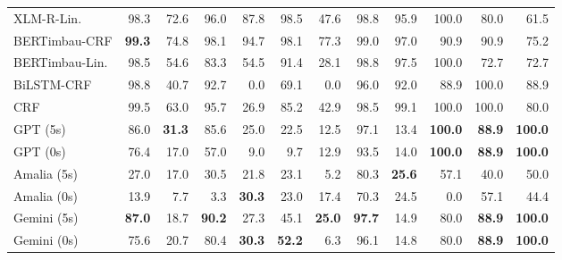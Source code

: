 \documentclass[11pt]{article}
\begin{document}
\begin{table}[ht!]
\begin{tabular*}{\textwidth}{@{\extracolsep{\fill}} l rrrrrrrrrrr @{}}
XLM-R-Lin.      & 98.3          & 72.6          & 96.0          & 87.8          & 98.5          & 47.6          & 98.8          & 95.9          & 100.0          & 80.0          & 61.5          \\
BERTimbau-CRF   & \textbf{99.3} & 74.8          & 98.1          & 94.7          & 98.1          & 77.3          & 99.0          & 97.0          & 90.9           & 90.9          & 75.2          \\
BERTimbau-Lin.  & 98.5          & 54.6          & 83.3          & 54.5          & 91.4          & 28.1          & 98.8          & 97.5          & 100.0          & 72.7          & 72.7          \\
BiLSTM-CRF      & 98.8          & 40.7          & 92.7          & 0.0           & 69.1          & 0.0           & 96.0          & 92.0          & 88.9           & 100.0         & 88.9          \\
CRF             & 99.5          & 63.0          & 95.7          & 26.9          & 85.2          & 42.9          & 98.5          & 99.1          & 100.0          & 100.0         & 80.0          \\
\midrule
GPT (5s)        & 86.0          & \textbf{31.3} & 85.6          & 25.0          & 22.5          & 12.5          & 97.1          & 13.4          & \textbf{100.0} & \textbf{88.9} & \textbf{100.0} \\
GPT (0s)        & 76.4          & 17.0          & 57.0          &  9.0          &  9.7          & 12.9          & 93.5          & 14.0          & \textbf{100.0} & \textbf{88.9} & \textbf{100.0} \\
Amalia (5s)     & 27.0          & 17.0          & 30.5          & 21.8          & 23.1          &  5.2          & 80.3          & \textbf{25.6} &  57.1          & 40.0          &  50.0          \\
Amalia (0s)     & 13.9          &  7.7          &  3.3          & \textbf{30.3} & 23.0          & 17.4          & 70.3          & 24.5          &   0.0          & 57.1          &  44.4          \\
Gemini (5s)     & \textbf{87.0} & 18.7          & \textbf{90.2} & 27.3          & 45.1          & \textbf{25.0} & \textbf{97.7} & 14.9          &  80.0          & \textbf{88.9} & \textbf{100.0} \\
Gemini (0s)     & 75.6          & 20.7          & 80.4          & \textbf{30.3} & \textbf{52.2} &  6.3          & 96.1          & 14.8          &  80.0          & \textbf{88.9} & \textbf{100.0} \\
\bottomrule
\end{tabular*}
\end{table}
\end{document}
